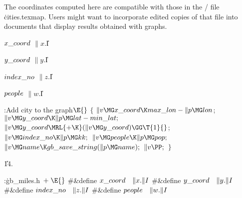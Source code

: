 The coordinates computed here are compatible with those in the \TEX/ file
\.{cities.texmap}. Users might want to incorporate edited copies of that file
into documents that display results obtained with  graphs.

\Y\B\4\D$\\{x\_coord}$ \5
$\|x.{}$\|I\par
\B\4\D$\\{y\_coord}$ \5
$\|y.{}$\|I\par
\B\4\D$\\{index\_no}$ \5
$\|z.{}$\|I\par
\B\4\D$\\{people}$ \5
$\|w.{}$\|I\par
\Y\B\4:Add city  to the graph\X${}\E{}$\6
${}\{{}$\1\6
${}\|v\MG\\{x\_coord}\K\\{max\_lon}-\|p\MG\\{lon}{}$;\6
${}\|v\MG\\{y\_coord}\K\|p\MG\\{lat}-\\{min\_lat};{}$\6
${}\|v\MG\\{y\_coord}\MRL{+{\K}}(\|v\MG\\{y\_coord})\GG\T{1}{}$;\6
${}\|v\MG\\{index\_no}\K\|p\MG\\{kk};{}$\6
${}\|v\MG\\{people}\K\|p\MG\\{pop};{}$\6
${}\|v\MG\\{name}\K\\{gb\_save\_string}(\|p\MG\\{name});{}$\6
${}\|v\PP;{}$\6
\4${}\}{}$\2\par
\U14.\fi

\B{}:\.{gb\_miles.h\,}\X${}\mathrel+\E{}$\6
\8\#\&{define} ${}\\{x\_coord}\hbox{\quad}\|x.\|I{}$\6
\8\#\&{define} ${}\\{y\_coord}\hbox{\quad}\|y.\|I{}$\6
\8\#\&{define} ${}\\{index\_no}\hbox{\quad}\|z.\|I{}$\6
\8\#\&{define} ${}\\{people}\hbox{\quad}\|w.\|I{}$\par
\fi


